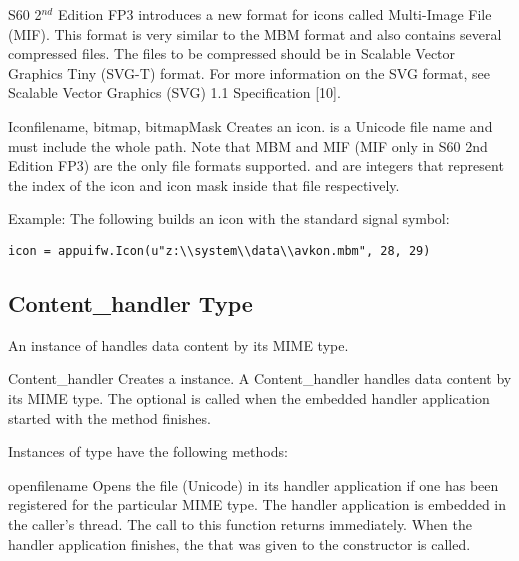 S60 2$^{nd}$ Edition FP3 introduces a new format for icons called 
Multi-Image File (MIF). This format is very similar to the MBM format and 
also contains several compressed files. The files to be compressed should be 
in Scalable Vector Graphics Tiny (SVG-T) format. For more information on the 
SVG format, see Scalable Vector Graphics (SVG) 1.1 Specification 
[10].

\begin{classdesc}{Icon}{filename, bitmap, bitmapMask}
Creates an icon.  is a Unicode file name and must 
include the whole path. Note that MBM and MIF (MIF only in S60 2nd 
Edition FP3) are the only file formats supported.  
and  are integers that represent the index of 
the icon and icon mask inside that file respectively.
\end{classdesc}

Example: The following builds an icon with the standard signal symbol:
\begin{verbatim}
icon = appuifw.Icon(u"z:\\system\\data\\avkon.mbm", 28, 29)
\end{verbatim}

\subsection{Content_handler Type}
\label{subsec:content}

An instance of  handles data content by its MIME 
type.

\begin{classdesc}{Content_handler}{}
Creates a  instance. A Content_handler handles
data content by its MIME type. The optional
 is called when the embedded handler application 
started with the  method finishes. 
\end{classdesc}

Instances of  type have the following methods:

\begin{methoddesc}{open}{filename}
Opens the file  (Unicode) in its handler 
application if one has been registered for the particular MIME type. The 
handler application is embedded in the caller's thread. The call to this 
function returns immediately. When the handler application finishes, the 
 that was given to the  
constructor is called.
\end{methoddesc}

